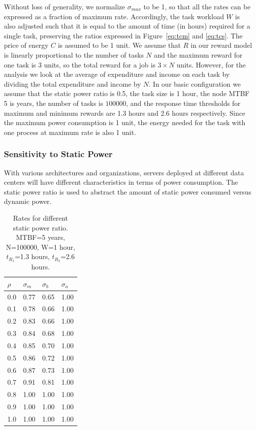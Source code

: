 Without loss of generality, we normalize $\sigma_{max}$ to be 1, so
that all the rates can be expressed as a fraction of maximum
rate. Accordingly, the task workload $W$ is also adjusted such that
it is equal to the amount of time (in hours) required for a single
task, preserving the ratios expressed in
Figure~\ref{eq:tcm} and \ref{eq:tcs}. The price of
energy $C$ is assumed to be 1 unit. We assume that $R$ in our reward model
is linearly proportional to the number of tasks $N$ and the maximum
reward for one task is 3 units, so the total reward for a job is $3
\times N$ units.  However, for the analysis we look
at the average of expenditure and income on each task by dividing the
total expenditure and income by $N$. In our basic configuration we
assume that the static power ratio is 0.5, the task size is 1 hour, the node MTBF 5 is
years, the number of tasks is $100000$, and the response time thresholds for
maximum and minimum rewards are 1.3 hours and 2.6 hours
respectively. Since the maximum power consumption is 1 unit, the
energy needed for the task with one process at maximum rate is also 1
unit. 

\subsubsection{Sensitivity to Static Power}

With various architectures and organizations, servers deployed at
different data centers will have different characteristics in terms of
power consumption. The static power ratio is used to abstract the
amount of static power consumed versus dynamic power.  

\begin{table}[!h]\small
	\caption{Rates for different static power ratio. MTBF=5 years, N=100000, W=1 hour, $t_{R_1}$=1.3 hours, $t_{R_2}$=2.6 hours.}
	\centering
		\begin{tabular}{|p{1cm}|p{1cm}|p{1cm}|p{1cm}|}
		\hline
		$\rho$ & $\sigma_m$ & $\sigma_b$ & $\sigma_a$ \\
		\hline
		0.0 &	0.77 & 	0.65 & 	1.00 \\
		\hline 
		0.1 &	0.78 &	0.66 &	1.00 \\
		\hline
		0.2 &	0.83 &	0.66 &	1.00 \\
		\hline
		0.3	&   0.84 &	0.68 &	1.00 \\
		\hline
		0.4	&   0.85 &	0.70 &	1.00 \\
		\hline
		0.5	&   0.86 &	0.72 &	1.00 \\
		\hline
		0.6	&   0.87 &	0.73 &	1.00 \\
		\hline
		0.7	&	0.91 &	0.81 &	1.00 \\
		\hline
		0.8	& 	1.00 &	1.00 &	1.00 \\
		\hline
		0.9	&	1.00 &	1.00 &	1.00 \\
		\hline
		1.0	&	1.00 &	1.00 &	1.00 \\
		\hline
		\end{tabular}
	\label{tbl:rho}
\end{table}

